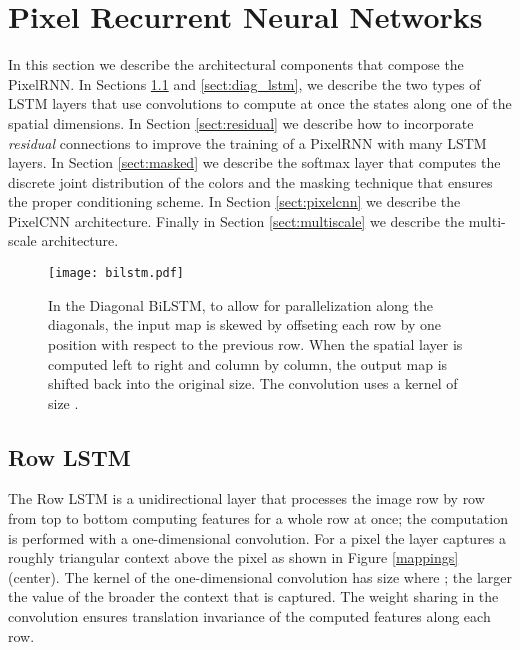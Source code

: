 \documentclass{article}
\begin{document}
 \section{Pixel Recurrent Neural Networks}
\label{sect:pixelrnn}

In this section we describe the architectural components that compose the {PixelRNN}. In Sections \ref{sect:row_lstm} and \ref{sect:diag_lstm}, we describe the two types of LSTM layers that use convolutions to compute at once the states along one of the spatial dimensions. 
In Section \ref{sect:residual} we describe how to incorporate \emph{residual} connections to improve the training of a PixelRNN with many LSTM layers.  In Section \ref{sect:masked} we describe the softmax layer that computes the {discrete} joint distribution of the colors and the masking technique that ensures the proper conditioning scheme. In Section \ref{sect:pixelcnn} we describe the PixelCNN architecture. Finally in Section \ref{sect:multiscale} we describe the multi-scale architecture.

\begin{figure}
\centering
\texttt{[image: bilstm.pdf]}
\vspace{-0.3cm}
\caption{In the Diagonal BiLSTM, to allow for parallelization along the diagonals, the input map is skewed by offseting each row by one position with respect to the previous row. When the spatial layer is computed left to right and column by column, the output map is shifted back into the original size. The convolution uses a kernel of size . }
\label{fig:bilstm}
\vspace{-0.3cm}
\end{figure}

\subsection{Row LSTM}
\label{sect:row_lstm}

The Row LSTM is a unidirectional layer that processes the image row by row from top to bottom computing features for a whole row at once; the computation is performed with a one-dimensional convolution. For a pixel  the layer captures a roughly triangular context above the pixel as shown in Figure \ref{mappings} (center). The kernel of the one-dimensional convolution has size  where ; the larger the value of  the broader the context that is captured. The weight sharing in the convolution ensures translation invariance of the computed features along each row.
\end{document}

